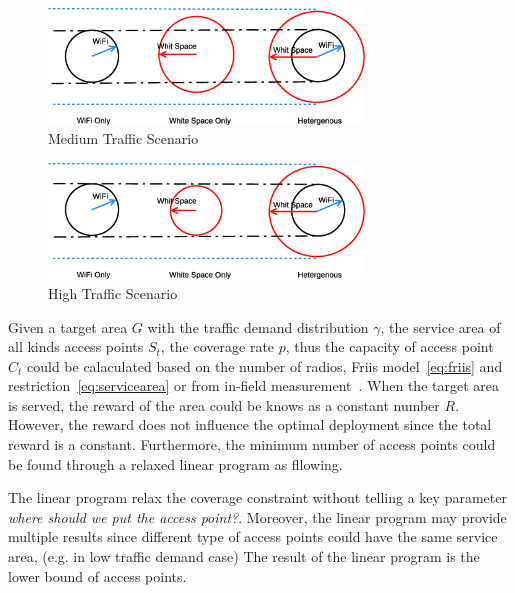\begin{figure}[h]
\centering
\includegraphics[width=84mm]{figures/mediumtraffic}
\vspace{-0.1in}
\caption{Medium Traffic Scenario}                                                                 
\label{fig:mediumtraffic}
\vspace{-0.1in}
\end{figure}


\begin{figure}[h]
\centering
\includegraphics[width=84mm]{figures/hightraffic}
\vspace{-0.1in}
\caption{High Traffic Scenario}                                                                 
\label{fig:hightraffic}
\vspace{-0.1in}
\end{figure}

Given a target area $G$ with the traffic demand distribution $\gamma$, the service area 
of all kinds access points $S_t$, the coverage rate $p$, thus the capacity of access point $C_t$ could 
be calaculated based on the number of radios, Friis model~\ref{eq:friis} and restriction~\ref{eq:servicearea}
or from in-field measurement~\cite{cuileveraging}. When the target area is served, the reward of the area 
could be knows as a constant number $R$. However, the reward does not influence the optimal deployment since 
the total reward is a constant. Furthermore, the minimum number of access points could be found through 
a relaxed linear program as fllowing. 



The linear program relax the coverage constraint without telling a key parameter
{\it where should we put the access point?}. Moreover, the linear program may provide 
multiple results since different type of access points could have the same service area, 
(e.g. in low traffic demand case) The result of the linear program is the lower bound of 
access points. 

